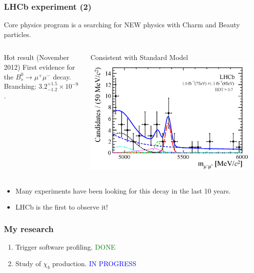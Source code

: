 \documentclass{beamer}
\begin{document}
\begin{frame}
\frametitle{LHCb experiment (2)}
Core physics program is a searching for NEW physics with Charm and Beauty particles.
\begin{columns}[c]
\begin{alertblock}{Hot result (November 2012)}
First evidence for the $B^{0}_{s} \rightarrow \mu^+ \mu^-$ decay.
Branching:  $3.2^{+1.5}_{-1.2} \times 10^{-9}$.
\end{alertblock}
Consistent with Standard Model
\includegraphics[width=\textwidth]{images/bs.png}
\end{columns}
\begin{itemize}
 \item Many experiments have been looking for this decay in the last 10 years.
 \item LHCb is the first to observe it!
\end{itemize}
\end{frame}
\begin{frame}
\frametitle{My research}
\begin{enumerate}
    \item Trigger software profiling. \textcolor{green}{DONE}
    \item Study of $\chi_{b}$ production. \textcolor{blue}{IN PROGRESS}
\end{enumerate}
\end{frame}
\end{document}

